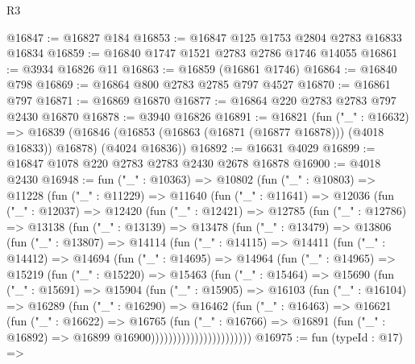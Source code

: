 \begin{lexlean}{R3}
\begin{coremodule}
@16847 := @16827 @184
@16853 := @16847 @125 @1753 @2804 @2783 @16833 @16834
@16859 := @16840 @1747 @1521 @2783 @2786 @1746 @14055
@16861 := @3934 @16826 @11
@16863 := @16859 (@16861 @1746)
@16864 := @16840 @798
@16869 := @16864 @800 @2783 @2785 @797 @4527
@16870 := @16861 @797
@16871 := @16869 @16870
@16877 := @16864 @220 @2783 @2783 @797 @2430 @16870
@16878 := @3940 @16826
@16891 := @16821
    (fun ("_" : @16632) =>
    @16839 (@16846 (@16853 (@16863 (@16871 (@16877 @16878))) (@4018 @16833)) @16878) (@4024 @16836))
@16892 := @16631 @4029
@16899 := @16847 @1078 @220 @2783 @2783 @2430 @2678 @16878
@16900 := @4018 @2430
@16948 := fun ("_" : @10363) =>
  @10802
    (fun ("_" : @10803) =>
    @11228
      (fun ("_" : @11229) =>
      @11640
        (fun ("_" : @11641) =>
        @12036
          (fun ("_" : @12037) =>
          @12420
            (fun ("_" : @12421) =>
            @12785
              (fun ("_" : @12786) =>
              @13138
                (fun ("_" : @13139) =>
                @13478
                  (fun ("_" : @13479) =>
                  @13806
                    (fun ("_" : @13807) =>
                    @14114
                      (fun ("_" : @14115) =>
                      @14411
                        (fun ("_" : @14412) =>
                        @14694
                          (fun ("_" : @14695) =>
                          @14964
                            (fun ("_" : @14965) =>
                            @15219
                              (fun ("_" : @15220) =>
                              @15463
                                (fun ("_" : @15464) =>
                                @15690
                                  (fun ("_" : @15691) =>
                                  @15904
                                    (fun ("_" : @15905) =>
                                    @16103
                                      (fun ("_" : @16104) =>
                                      @16289
                                        (fun ("_" : @16290) =>
                                        @16462
                                          (fun ("_" : @16463) =>
                                          @16621
                                            (fun ("_" : @16622) =>
                                            @16765
                                              (fun ("_" : @16766) =>
                                              @16891
                                                (fun ("_" : @16892) =>
                                                @16899 @16900)))))))))))))))))))))))
@16975 := fun (typeId : @17) =>

\end{coremodule}
\end{lexlean}
